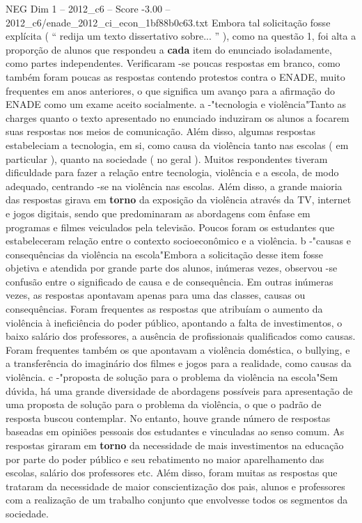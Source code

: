 \begin{textsample}{NEG Dim 1 – 2012\_c6 – Score -3.00 – 2012\_c6/enade\_2012\_ci\_econ\_1bf88b0c63.txt}
Embora tal solicitação fosse explícita ( “ redija um texto dissertativo sobre... ” ), como na questão 1, foi alta a proporção de alunos que respondeu a \textbf{cada} item do enunciado isoladamente, como partes independentes.
Verificaram -se poucas respostas em branco, como também foram poucas as respostas contendo protestos contra o ENADE, muito frequentes em anos anteriores, o que significa um avanço para a afirmação do ENADE como um exame aceito socialmente. a -"tecnologia e violência"Tanto as charges quanto o texto apresentado no enunciado induziram os alunos a focarem suas respostas nos meios de comunicação.
Além disso, algumas respostas estabeleciam a tecnologia, em si, como causa da violência tanto nas escolas ( em particular ), quanto na sociedade ( no geral ).
Muitos respondentes tiveram dificuldade para fazer a relação entre tecnologia, violência e a escola, de modo adequado, centrando -se na violência nas escolas.
Além disso, a grande maioria das respostas girava em \textbf{torno} da exposição da violência através da TV, internet e jogos digitais, sendo que predominaram as abordagens com ênfase em programas e filmes veiculados pela televisão.
Poucos foram os estudantes que estabeleceram relação entre o contexto socioeconômico e a violência. b -"causas e consequências da violência na escola"Embora a solicitação desse item fosse objetiva e atendida por grande parte dos alunos, inúmeras vezes, observou -se confusão entre o significado de causa e de consequência.
Em outras inúmeras vezes, as respostas apontavam apenas para uma das classes, causas ou consequências.
Foram frequentes as respostas que atribuíam o aumento da violência à ineficiência do poder público, apontando a falta de investimentos, o baixo salário dos professores, a ausência de profissionais qualificados como causas.
Foram frequentes também os que apontavam a violência doméstica, o bullying, e a transferência do imaginário dos filmes e jogos para a realidade, como causas da violência. c -"proposta de solução para o problema da violência na escola"Sem dúvida, há uma grande diversidade de abordagens possíveis para apresentação de uma proposta de solução para o problema da violência, o que o padrão de resposta buscou contemplar.
No entanto, houve grande número de respostas baseadas em opiniões pessoais dos estudantes e vinculadas ao senso comum.
As respostas giraram em \textbf{torno} da necessidade de mais investimentos na educação por parte do poder público e seu rebatimento no maior aparelhamento das escolas, salário dos professores etc.
Além disso, foram muitas as respostas que trataram da necessidade de maior conscientização dos pais, alunos e professores com a realização de um trabalho conjunto que envolvesse todos os segmentos da sociedade.

\end{textsample}
